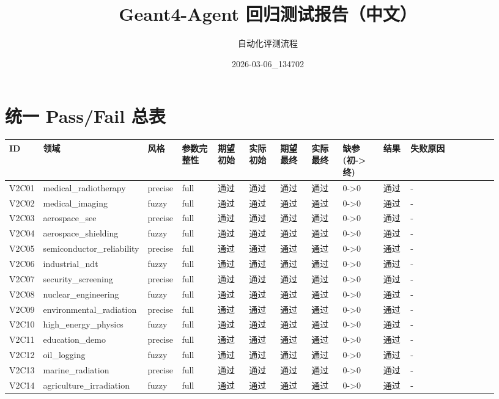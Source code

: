 \documentclass[11pt]{ctexart}
\title{Geant4-Agent 回归测试报告（中文）}
\author{自动化评测流程}
\date{2026-03-06\_134702}
\begin{document}
\maketitle
\section{统一 Pass/Fail 总表}
\begin{longtable}{p{0.06\linewidth}p{0.08\linewidth}p{0.07\linewidth}p{0.08\linewidth}p{0.07\linewidth}p{0.07\linewidth}p{0.07\linewidth}p{0.07\linewidth}p{0.09\linewidth}p{0.06\linewidth}p{0.21\linewidth}}
\toprule
ID & 领域 & 风格 & 参数完整性 & 期望初始 & 实际初始 & 期望最终 & 实际最终 & 缺参(初->终) & 结果 & 失败原因 \\
\midrule
V2C01 & medical\_radiotherapy & precise & full & 通过 & 通过 & 通过 & 通过 & 0->0 & 通过 & - \\
V2C02 & medical\_imaging & fuzzy & full & 通过 & 通过 & 通过 & 通过 & 0->0 & 通过 & - \\
V2C03 & aerospace\_see & precise & full & 通过 & 通过 & 通过 & 通过 & 0->0 & 通过 & - \\
V2C04 & aerospace\_shielding & fuzzy & full & 通过 & 通过 & 通过 & 通过 & 0->0 & 通过 & - \\
V2C05 & semiconductor\_reliability & precise & full & 通过 & 通过 & 通过 & 通过 & 0->0 & 通过 & - \\
V2C06 & industrial\_ndt & fuzzy & full & 通过 & 通过 & 通过 & 通过 & 0->0 & 通过 & - \\
V2C07 & security\_screening & precise & full & 通过 & 通过 & 通过 & 通过 & 0->0 & 通过 & - \\
V2C08 & nuclear\_engineering & fuzzy & full & 通过 & 通过 & 通过 & 通过 & 0->0 & 通过 & - \\
V2C09 & environmental\_radiation & precise & full & 通过 & 通过 & 通过 & 通过 & 0->0 & 通过 & - \\
V2C10 & high\_energy\_physics & fuzzy & full & 通过 & 通过 & 通过 & 通过 & 0->0 & 通过 & - \\
V2C11 & education\_demo & precise & full & 通过 & 通过 & 通过 & 通过 & 0->0 & 通过 & - \\
V2C12 & oil\_logging & fuzzy & full & 通过 & 通过 & 通过 & 通过 & 0->0 & 通过 & - \\
V2C13 & marine\_radiation & precise & full & 通过 & 通过 & 通过 & 通过 & 0->0 & 通过 & - \\
V2C14 & agriculture\_irradiation & fuzzy & full & 通过 & 通过 & 通过 & 通过 & 0->0 & 通过 & - \\

\end{longtable}
\end{document}
